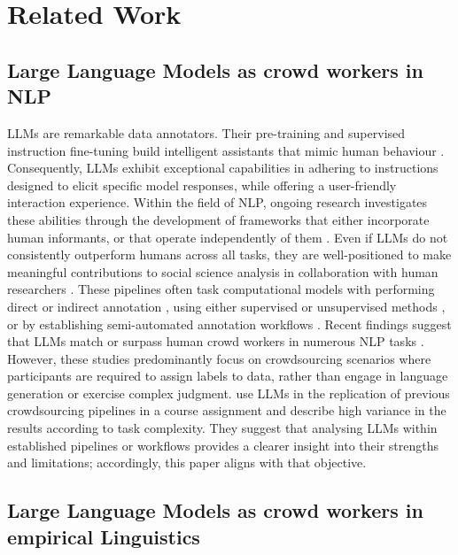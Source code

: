 \section{Related Work}
\label{sec:related}
\subsection{Large Language Models as crowd workers in NLP}

LLMs are remarkable data annotators. Their pre-training and supervised instruction fine-tuning build intelligent assistants that mimic human behaviour \citep{openai_gpt-4_2023}. Consequently, LLMs exhibit exceptional capabilities in adhering to instructions designed to elicit specific model responses, while offering a user-friendly interaction experience. Within the field of NLP, ongoing research investigates these abilities through the development of frameworks that either incorporate human informants, or that operate independently of them \citep{kocon_chatgpt_2023}. Even if LLMs do not consistently outperform humans across all tasks, they are well-positioned to make meaningful contributions to social science analysis in collaboration with human researchers \citep{ziems_can_2024}. These pipelines often task computational models with performing direct or indirect annotation \citep{van_dalfsen_direct_2024}, using either supervised or unsupervised methods \citep{horych_promises_2024}, or by establishing semi-automated annotation workflows \citep{ostyakova_chatgpt_2023, xu_role_2024}. Recent findings suggest that LLMs match or surpass human crowd workers in numerous NLP tasks \citep{tornberg_chatgpt-4_2023, ziems_can_2024, he_annollm_2023, kocon_chatgpt_2023, gilardi_chatgpt_2023}. However, these studies predominantly focus on crowdsourcing scenarios where participants are required to assign labels to data, rather than engage in language generation or exercise complex judgment. \citet{wu_llms_2025} use LLMs in the replication of previous crowdsourcing pipelines in a course assignment and describe high variance in the results according to task complexity. They suggest that analysing LLMs within established pipelines or workflows provides a clearer insight into their strengths and limitations; accordingly, this paper aligns with that objective.


\subsection{Large Language Models as crowd workers in empirical Linguistics}

